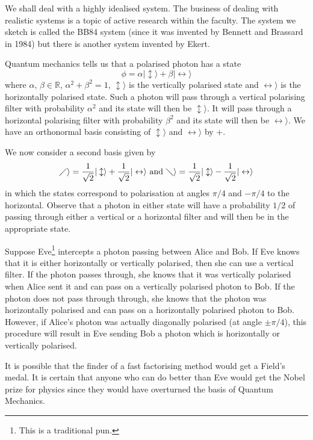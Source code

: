 \documentclass[12pt,a4paper]{article}
\theoremstyle{plain}
\theoremstyle{definition}
\begin{document}
    We shall deal with a highly idealised system.
    The business of dealing with realistic systems
    is a topic of active research within the faculty.
    The system we sketch is called the BB84 system
    (since it was invented by Bennett and Brassard in 1984)
    but there is another system invented by Ekert.

    Quantum mechanics tells us that a polarised photon
    has a state
    \[\phi=\alpha|\updownarrow\rangle+
    \beta|\leftrightarrow\rangle\]
    where $\alpha,\,\beta\in{\mathbb R}$,
    $\alpha^{2}+\beta^{2}=1$,
    $\updownarrow\rangle$ is the vertically polarised
    state and $\leftrightarrow\rangle$ is the
    horizontally polarised state. Such a photon
    will pass through a vertical polarising filter
    with probability $\alpha^{2}$
    and its state will then be $\updownarrow\rangle$.
    It will pass through a horizontal polarising
    filter with probability $\beta^{2}$
    and its state will then be $\leftrightarrow\rangle$.
    We have an orthonormal basis consisting of
    $\updownarrow\rangle$
    and $\leftrightarrow\rangle$ by $+$.

    We now consider a second basis given
    by
    \[\diagup\rangle=\frac{1}{\sqrt 2}|\updownarrow\rangle+
    \frac{1}{\sqrt 2}|\leftrightarrow\rangle
    \ \text{and}
    \ \diagdown\rangle=\frac{1}{\sqrt 2}|\updownarrow\rangle
    -\frac{1}{\sqrt 2}|\leftrightarrow\rangle\]
    in which the states correspond to polarisation
    at angles $\pi/4$ and $-\pi/4$ to the horizontal.
    Observe that a photon in either state
    will have a probability $1/2$ of passing through
    either a vertical or a horizontal filter
    and will then be in the appropriate state.

    Suppose Eve\footnote{This is a traditional pun.}
    intercepts a photon passing between Alice and Bob.
    If Eve knows that it is either horizontally
    or vertically polarised, then she can use a vertical
    filter. If the photon passes through, she knows that
    it was vertically polarised when Alice sent it
    and can pass on a vertically polarised photon to Bob.
    If the photon does not pass through through, she knows that
    the photon was horizontally polarised
    and can pass on a horizontally polarised photon to Bob.
    However, if Alice's photon was actually diagonally
    polarised (at angle $\pm\pi/4$), this procedure
    will result in Eve sending Bob a photon which is
    horizontally or vertically polarised.

    It is possible that the finder of a fast factorising
    method would get a Field's medal. It is certain that
    anyone who can do better than Eve would get the Nobel
    prize for physics since they would have overturned
    the basis of Quantum Mechanics.
\end{document}
